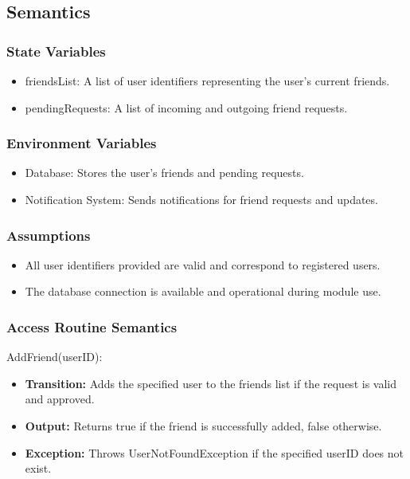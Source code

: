 \documentclass[12pt, titlepage]{article}
\begin{document}
\subsection{Semantics}

\subsubsection{State Variables}

\begin{itemize}
  \item friendsList: A list of user identifiers representing the user's current friends.
  \item pendingRequests: A list of incoming and outgoing friend requests.
\end{itemize}

\subsubsection{Environment Variables}

\begin{itemize}
  \item Database: Stores the user’s friends and pending requests.
  \item Notification System: Sends notifications for friend requests and updates.
\end{itemize}

\subsubsection{Assumptions}

\begin{itemize}
  \item All user identifiers provided are valid and correspond to registered users.
  \item The database connection is available and operational during module use.
\end{itemize}

\subsubsection{Access Routine Semantics}

\noindent AddFriend(userID):
\begin{itemize}
  \item \textbf{Transition:} Adds the specified user to the friends list if the request is valid and approved.
  \item \textbf{Output:} Returns true if the friend is successfully added, false otherwise.
  \item \textbf{Exception:} Throws UserNotFoundException if the specified userID does not exist.
\end{itemize}
\end{document}
